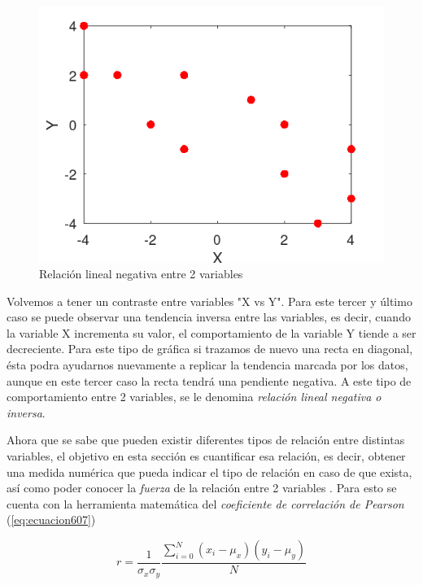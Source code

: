 \begin{figure}[h]
	\centering
	\includegraphics[scale=0.7]{imgss143.png}
	\caption{Relación lineal negativa entre 2 variables}
	\label{fig:figura600_4}
\end{figure}

Volvemos a tener un contraste entre variables "X vs Y". Para este tercer y último caso se puede observar una tendencia inversa entre las variables, es decir, cuando la variable X incrementa su valor, el comportamiento 
de la variable Y tiende a ser decreciente. Para este tipo de gráfica si trazamos de nuevo una recta en diagonal, ésta podra ayudarnos nuevamente a replicar la tendencia marcada por los datos, aunque en este tercer caso 
la recta tendrá una pendiente negativa. A este tipo de comportamiento entre 2 variables, se le denomina \textit{relación lineal negativa o inversa}.

Ahora que se sabe que pueden existir diferentes tipos de relación entre distintas variables, el objetivo en esta sección es cuantificar esa relación, es decir, obtener una medida numérica que pueda indicar el tipo de 
relación en caso de que exista, así como poder conocer la \textit{fuerza} de la relación entre 2 variables \cite{anderson}. Para esto se cuenta con la herramienta matemática del \textit{coeficiente de correlación de Pearson} (\ref{eq:ecuacion607})

\begin{equation}
	r=\frac{1}{\sigma_x \sigma_y} \frac{\sum_{i=0}^{N} (x_i - \mu_x)(y_i - \mu_y)}{N}
	\label{eq:ecuacion607}
\end{equation}

